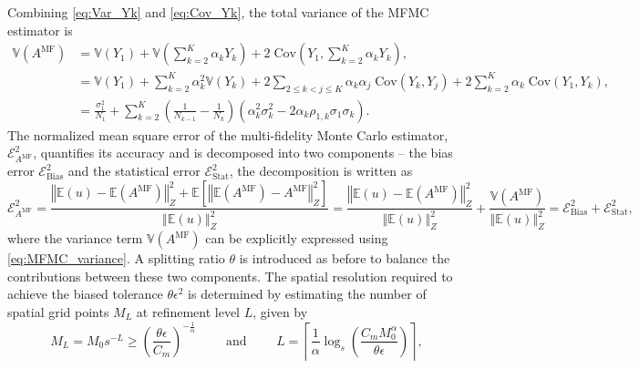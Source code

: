 %
Combining \eqref{eq:Var_Yk} and \eqref{eq:Cov_Yk}, the total variance of the MFMC estimator is 
%
\begin{align}
    \nonumber
    \mathbb{V}\left(A^{\text{MF}}\right) &= \mathbb{V}\left(Y_1\right) + \mathbb{V}\left(\sum_{k=2}^K \alpha_kY_k\right)+2\;\text{Cov}\left(Y_1,\sum_{k=2}^K \alpha_k Y_k \right),\\
    \nonumber
    &=\mathbb{V}\left(Y_1\right) + \sum_{k=2}^K \alpha_k^2 \mathbb{V}\left(Y_k\right)+2\sum_{2\le k<j\le K} \alpha_k\alpha_j\; \text{Cov}(Y_k,Y_j) +2\sum_{k=2}^K \alpha_k\;\text{Cov}\left(Y_1, Y_k\right),\\
    \label{eq:MFMC_variance}
    &=\frac{\sigma_1^2}{N_1} + \sum_{k=2}^K \left(\frac{1}{N_{k-1}} - \frac{1}{N_k}\right)\left(\alpha_k^2\sigma_k^2 - 2\alpha_k\rho_{1,k}\sigma_1\sigma_k\right).
\end{align}
%
The normalized mean square error of the multi-fidelity Monte Carlo estimator, $\mathcal{E}_{A^{\text{MF}}}^2$, quantifies its accuracy and is decomposed into two components -- the bias error $\mathcal{E}_{\text{Bias}}^2$ and the statistical error $\mathcal{E}_{\text{Stat}}^2$, the decomposition is written as 
%
\[
\mathcal{E}_{A^{\text{MF}}}^2= \frac{\left\Vert\mathbb{E}(u)-\mathbb{E}(A^{\text{MF}}) \right\Vert_{Z}^2+\mathbb E\left[\left\Vert\mathbb{E}(A^{\text{MF}})-A^{\text{MF}} \right\Vert_{Z}^2\right]}{\left\Vert\mathbb{E}(u) \right\Vert_{Z}^2} =\frac{\left\Vert\mathbb{E}(u)-\mathbb{E}(A^{\text{MF}}) \right\Vert_{Z}^2}{\left\Vert\mathbb{E}(u) \right\Vert_{Z}^2}+ \frac{\mathbb{V}\left(A^{\text{MF}}\right)}{\left\Vert\mathbb{E}(u) \right\Vert_{Z}^2}=\mathcal{E}_{\text{Bias}}^2 + \mathcal{E}_{\text{Stat}}^2,
\]
%
where the variance term $\mathbb{V}\left(A^{\text{MF}}\right)$  can be explicitly expressed using \eqref{eq:MFMC_variance}. A splitting ratio $\theta$ is introduced as before to balance the contributions between these two components. The spatial resolution required to achieve the biased tolerance $\theta \epsilon^2$ is determined by estimating the number of spatial grid points $M_L$ at refinement level $L$, given by
%
\begin{equation}
    \label{eq:SLSGC_MLS_SpatialGridsNo}
    M_L = M_0s^{-L} \ge \left(\frac{\theta\epsilon}{C_m}\right)^{-\frac 1 {\alpha}} \qquad \text{ and } \qquad     L = \left\lceil \frac{1}{\alpha}\log_s \left(\frac{C_m M_0^\alpha}{\theta\epsilon}\right) \right\rceil,
\end{equation}
